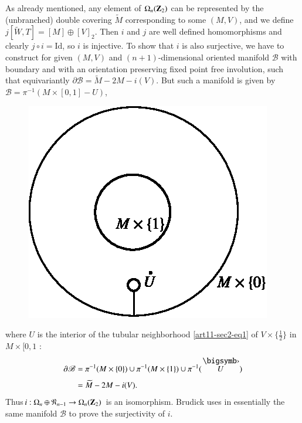 As already mentioned, any element of $\Omega_{n}(\mathbf{Z}_{2})$ can be represented by the (unbranched) double covering $\widetilde{M}$ corresponding to some $(M,V)$, and we define $j[\widetilde{W},T]=[M]\oplus [V]_{2}$. Then $i$ and $j$ are well defined homomorphisms and clearly $j\circ i=\text{Id}$, so $i$ is injective. To show that $i$ is also surjective, we have to construct for given $(M,V)$ and $(n+1)$-dimensional oriented manifold $\mathscr{B}$ with boundary and with an orientation preserving fixed point free involution, such that equivariantly $\partial \mathscr{B}=\widetilde{M}-2M-i(V)$. But such a manifold is given by $\mathscr{B}=\pi^{-1}(M\times [0,1]-U)$,
\begin{figure}[H]
\centering
\includegraphics{figures/fig7.eps}
\end{figure}
\noindent
where $U$ is the interior of the tubular neighborhood \eqref{art11-sec2-eq1} of $V\times \{\frac{1}{2}\}$ in $M\times [0,1$ :
\begin{align*}
\partial \mathscr{B} &= \pi^{-1}(M\times \{0\})\cup \pi^{-1}(M\times \{1\})\cup \pi^{-1}(\overdot{U})\\[3pt]
&= \widetilde{M}-2M-i(V).
\end{align*}
Thus\pageoriginale $i:\Omega_{n}\oplus \mathfrak{N}_{n-1}\to \Omega_{n}(\mathbf{Z}_{2})$ is an isomorphism. Brudick uses in \cite{art11-key4} essentially the same manifold $\mathscr{B}$ to prove the surjectivity of $i$.

